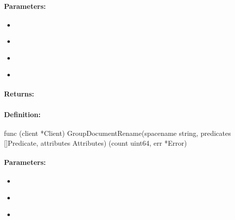 \paragraph{Parameters:}
\begin{itemize}[noitemsep]
\item {}\\

\item {}\\

\item {}\\

\item {}\\

\end{itemize}

\paragraph{Returns:}


\pagebreak
\subsubsection{}
\label{api:Go:GroupDocumentRename}


\paragraph{Definition:}
\begin{gocode}
func (client *Client) GroupDocumentRename(spacename string, predicates []Predicate, attributes Attributes) (count uint64, err *Error)
\end{gocode}

\paragraph{Parameters:}
\begin{itemize}[noitemsep]
\item {}\\

\item {}\\

\item {}\\

\end{itemize}

